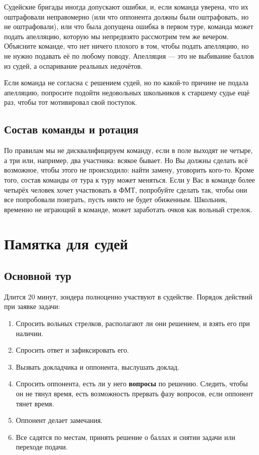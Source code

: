 \documentclass[12pt]{article}
\begin{document}
Судейские бригады иногда допускают ошибки, и, если команда уверена, что их оштрафовали неправомерно (или что оппонента должны были оштрафовать, но не оштрафовали), или что была допущена ошибка в первом туре, команда может подать апелляцию, которую мы непредвзято рассмотрим тем же вечером. Объясните команде, что нет ничего плохого в том, чтобы подать апелляцию, но не нужно подавать её по любому поводу. Апелляция --- это не выбивание баллов из судей, а оспаривание реальных недочётов. 

Если команда не согласна с решением судей, но по какой-то причине не подала апелляцию, попросите подойти недовольных школьников к старшему судье ещё раз, чтобы тот мотивировал свой поступок.

\subsection*{Состав команды и ротация}
По правилам мы не дисквалифицируем команду, если в поле выходят не четыре, а три или, например, два участника: всякое бывает. Но Вы должны сделать всё возможное, чтобы этого не происходило: найти замену, уговорить кого-то. Кроме того, состав команды от тура к туру может меняться. Если у Вас в команде более четырёх человек хочет участвовать в ФМТ, попробуйте сделать так, чтобы они все попробовали поиграть, пусть никто не будет обиженным. Школьник, временно не играющий в команде, может заработать очков как вольный стрелок.

\newpage
\section*{Памятка для судей}
\subsection*{Основной тур}
Длится 20 минут, зондера полноценно участвуют в судействе.
Порядок действий при заявке задачи:
\begin{enumerate}
	\item Спросить вольных стрелков, располагают ли они решением, и взять его при наличии.
	\item Спросить ответ и зафиксировать его.
	\item Вызвать докладчика и оппонента, выслушать доклад.
	\item Спросить оппонента, есть ли у него {\bf вопросы} по решению. Следить, чтобы он не тянул время, есть возможность прервать фазу вопросов, если оппонент тянет время.
	\item Оппонент делает замечания.
	\item Все садятся по местам, принять решение о баллах и снятии задачи или переходе подачи.
\end{enumerate}
\end{document}
